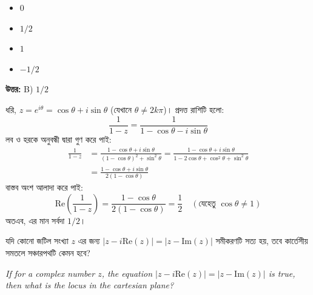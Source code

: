 \documentclass[12pt, a4paper]{article}
\begin{document}
\begin{itemize}[label={}, leftmargin=1cm, itemsep=0.5em]
    \item[\textbf{A)}] $0$
    \item[\textbf{B)}] $1/2$
    \item[\textbf{C)}] $1$
    \item[\textbf{D)}] $-1/2$
\end{itemize}

\vspace{0.5em}
\begin{tcolorbox}[answerbox]
    \textbf{\color{success} উত্তর:} B) $1/2$
\end{tcolorbox}
\vspace{1em}

\begin{tcolorbox}[solutionbox={সমাধান (Solution)}]
    \noindent
    ধরি, $z = e^{i\theta} = \cos\theta + i\sin\theta$ (যেখানে $\theta \neq 2k\pi$)। প্রদত্ত রাশিটি হলো:
    \[ \frac{1}{1-z} = \frac{1}{1-\cos\theta - i\sin\theta} \]
    লব ও হরকে অনুবন্ধী দ্বারা গুণ করে পাই:
    \begin{align*}
        \frac{1}{1-z} &= \frac{1-\cos\theta + i\sin\theta}{(1-\cos\theta)^2 + \sin^2\theta} = \frac{1-\cos\theta + i\sin\theta}{1 - 2\cos\theta + \cos^2\theta + \sin^2\theta} \\
        &= \frac{1-\cos\theta + i\sin\theta}{2(1-\cos\theta)}
    \end{align*}
    বাস্তব অংশ আলাদা করে পাই:
    \[ \text{Re}\left(\frac{1}{1-z}\right) = \frac{1-\cos\theta}{2(1-\cos\theta)} = \frac{1}{2} \quad (\text{যেহেতু } \cos\theta \neq 1) \]
    অতএব, এর মান সর্বদা $1/2$।
\end{tcolorbox}

\vspace{1em}

\begin{tcolorbox}[questionbox={প্রশ্ন (Question) 13}]
    \noindent
    যদি কোনো জটিল সংখ্যা $z$ এর জন্য $|z - i \text{Re}(z)| = |z - \text{Im}(z)|$ সমীকরণটি সত্য হয়, তবে কার্তেসীয় সমতলে সঞ্চারপথটি কেমন হবে?
    
    \vspace{0.8em}
    \begin{english}
    \noindent\textit{\color{darkgray}
    If for a complex number $z$, the equation $|z - i \text{Re}(z)| = |z - \text{Im}(z)|$ is true, then what is the locus in the cartesian plane?
    }
    \end{english}
\end{tcolorbox}
\end{document}
